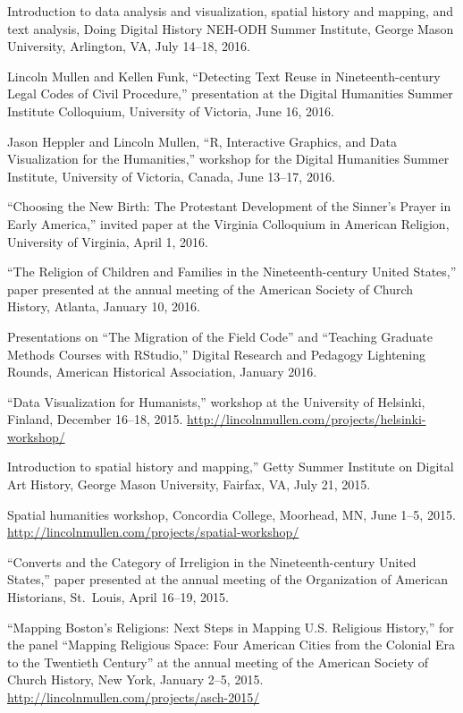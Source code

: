 \documentclass[11pt]{article}
\begin{document}
Introduction to data analysis and visualization, spatial history and mapping, 
and text analysis, Doing Digital History NEH-ODH Summer Institute, George 
Mason University, Arlington, VA, July 14--18, 2016.

Lincoln Mullen and Kellen Funk, ``Detecting Text Reuse in Nineteenth-century 
Legal Codes of Civil Procedure,'' presentation at the Digital Humanities 
Summer Institute Colloquium, University of Victoria, June 16, 2016.

Jason Heppler and Lincoln Mullen, ``R, Interactive Graphics, and Data 
Visualization for the Humanities,'' workshop for the Digital Humanities Summer 
Institute, University of Victoria, Canada, June 13--17, 2016.  

``Choosing the New Birth: The Protestant Development of the Sinner's Prayer in 
Early America,'' invited paper at the Virginia Colloquium in American 
Religion, University of Virginia, April 1, 2016.

``The Religion of Children and Families in the Nineteenth-century United 
States,'' paper presented at the annual meeting of the American Society of 
Church History, Atlanta, January 10, 2016.

Presentations on ``The Migration of the Field Code'' and ``Teaching 
Graduate Methods Courses with RStudio,'' Digital Research and Pedagogy 
Lightening Rounds, American Historical Association, January 2016.

``Data Visualization for Humanists,'' workshop at the University of Helsinki, 
Finland, December 16--18, 2015. 
\url{http://lincolnmullen.com/projects/helsinki-workshop/}

Introduction to spatial history and mapping,'' Getty Summer Institute on 
Digital Art History, George Mason University, Fairfax, VA, July 21, 2015.

Spatial humanities workshop, Concordia College, Moorhead, MN, June 1--5, 2015.  
\url{http://lincolnmullen.com/projects/spatial-workshop/}

``Converts and the Category of Irreligion in the Nineteenth-century
United States,'' paper presented at the annual meeting of the
Organization of American Historians, St.~Louis, April 16--19, 2015.

``Mapping Boston's Religions: Next Steps in Mapping U.S. Religious History,'' 
for the panel ``Mapping Religious Space: Four American Cities from the 
Colonial Era to the Twentieth Century'' at the annual meeting of the American 
Society of Church History, New York, January 2--5, 2015.  
\url{http://lincolnmullen.com/projects/asch-2015/}
\end{document}
